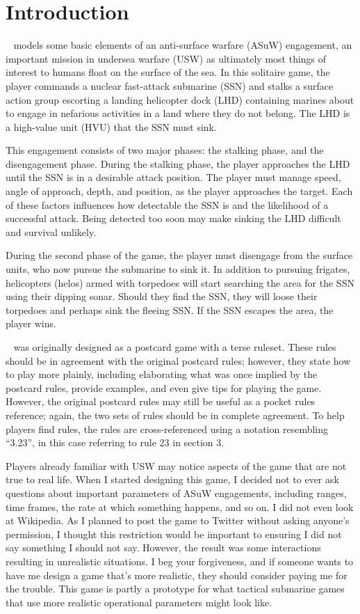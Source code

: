 \documentclass[../TacSubGameRules.tex]{subfiles}
\begin{document}
\section*{Introduction}

\gametitle~ models some basic elements of an anti-surface warfare (ASuW) engagement, an important mission in undersea warfare (USW) as ultimately most things of interest to humans float on the surface of the sea.
In this solitaire game, the player commands a nuclear fast-attack submarine (SSN) and stalks a surface action group escorting a landing helicopter dock (LHD) containing marines about to engage in nefarious activities in a land where they do not belong.
The LHD is a high-value unit (HVU) that the SSN must sink.

This engagement consists of two major phases: the stalking phase, and the disengagement phase.
During the stalking phase, the player approaches the LHD until the SSN is in a desirable attack position.
The player must manage speed, angle of approach, depth, and position, as the player approaches the target.
Each of these factors influences how detectable the SSN is and the likelihood of a successful attack.
Being detected too soon may make sinking the LHD difficult and survival unlikely.

During the second phase of the game, the player must disengage from the surface units, who now pursue the submarine to sink it.
In addition to pursuing frigates, helicopters (helos) armed with torpedoes will start searching the area for the SSN using their dipping sonar.
Should they find the SSN, they will loose their torpedoes and perhaps sink the fleeing SSN.
If the SSN escapes the area, the player wins.

\gametitle~ was originally designed as a postcard game with a terse ruleset.
These rules should be in agreement with the original postcard rules; however, they state how to play more plainly, including elaborating what was once implied by the postcard rules, provide examples, and even give tips for playing the game.
However, the original postcard rules may still be useful as a pocket rules reference; again, the two sets of rules should be in complete agreement.
To help players find rules, the rules are cross-referenced using a notation resembling ``3.23'', in this case referring to rule 23 in section 3.

Players already familiar with USW may notice aspects of the game that are not true to real life.
When I started designing this game, I decided not to ever ask questions about important parameters of ASuW engagements, including ranges, time frames, the rate at which something happens, and so on.
I did not even look at Wikipedia.
As I planned to post the game to Twitter without asking anyone's permission, I thought this restriction would be important to ensuring I did not say something I should not say.
However, the result was some interactions resulting in unrealistic situations.
I beg your forgiveness, and if someone wants to have me design a game that's more realistic, they should consider paying me for the trouble.
This game is partly a prototype for what tactical submarine games that use more realistic operational parameters might look like.
\end{document}
